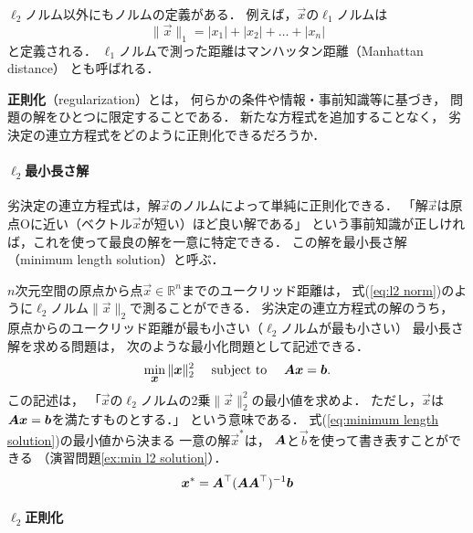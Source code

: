 $\ell_2$ノルム以外にもノルムの定義がある．
例えば，$\vec x$の$\ell_1$ノルムは
\begin{equation}
 \|\vec x\|_1=|x_1|+|x_2|+\dots+|x_n|
\label{eq:l1 norm}
\end{equation}
と定義される．
$\ell_1$ノルムで測った距離はマンハッタン距離（Manhattan distance）
とも呼ばれる．




{\bf 正則化}（regularization）とは，
何らかの条件や情報・事前知識等に基づき，
問題の解をひとつに限定することである．
新たな方程式を追加することなく，
劣決定の連立方程式をどのように正則化できるだろうか．


\paragraph{$\ell_2$最小長さ解}

劣決定の連立方程式は，解$\vec x$のノルムによって単純に正則化できる．
「解$\vec x$は原点Oに近い（ベクトル$\vec x$が短い）ほど良い解である」
という事前知識が正しければ，これを使って最良の解を一意に特定できる．
この解を最小長さ解（minimum length solution）と呼ぶ．

$n$次元空間の原点から点$\vec x\in\mathbb{R}^n$までのユークリッド距離は，
式(\ref{eq:l2 norm})のように$\ell_2$ノルム$\|\vec x\|_2$で測ることができる．
劣決定の連立方程式の解のうち，
原点からのユークリッド距離が最も小さい（$\ell_2$ノルムが最も小さい）
最小長さ解を求める問題は，
次のような最小化問題として記述できる．
\begin{equation}
 \min_{\small\mbox{\boldmath $x$}}\|\mbox{\boldmath $x$}\|_2^2\quad\mbox{ subject to }\quad
\mbox{\boldmath $A$}\mbox{\boldmath $x$}=\mbox{\boldmath $b$}.
\label{eq:minimum length solution}
\end{equation}
この記述は，
「$\vec x$の$\ell_2$ノルムの2乗$\|\vec x\|_2^2$の最小値を求めよ．
ただし，$\vec x$は$\mbox{\boldmath $A$}\mbox{\boldmath $x$}=\mbox{\boldmath $b$}$を満たすものとする．」
という意味である．
式(\ref{eq:minimum length solution})の最小値から決まる
一意の解$\vec x^*$は，
$\mbox{\boldmath $A$}$と$\vec b$を使って書き表すことができる
（演習問題\ref{ex:min l2 solution}）．
\begin{equation}
\mbox{\boldmath $x$}^*=\mbox{\boldmath $A$}^\top(\mbox{\boldmath $A$}\mbox{\boldmath $A$}^\top)^{-1}\mbox{\boldmath $b$}
\label{eq:MLS}
\end{equation}


\paragraph{$\ell_2$正則化}

